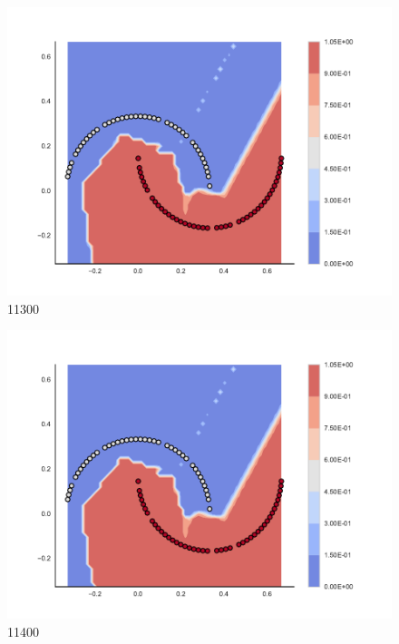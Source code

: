 \begin{subfigure}[b]{0.09\textwidth}
    \includegraphics[clip, trim=2.35cm 1.75cm 4.5cm 0cm,width=\textwidth]{img/convergence/11300.pdf}
    \caption{11300}
    \label{fig:convergence_11300}
\end{subfigure}
%
\begin{subfigure}[b]{0.09\textwidth}
    \includegraphics[clip, trim=2.35cm 1.75cm 4.5cm 0cm,width=\textwidth]{img/convergence/11400.pdf}
    \caption{11400}
    \label{fig:convergence_11400}
\end{subfigure}
%
